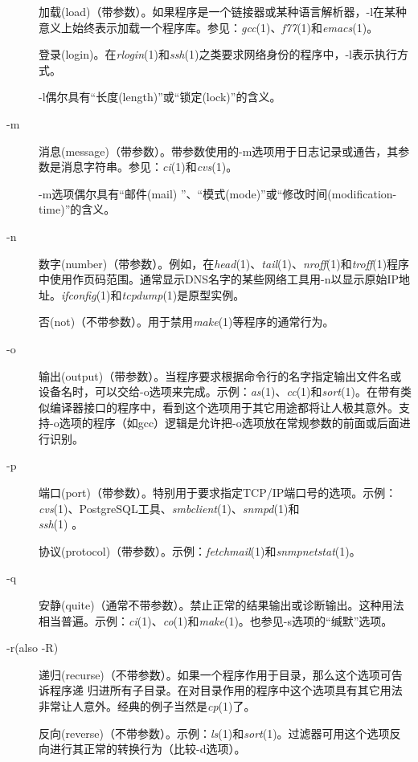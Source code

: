 \documentclass[12pt,oneside]{book}
\begin{document}
\begin{description}
加载(load)（带参数）。如果程序是一个链接器或某种语言解析器，-l在某种意义上始终表示加载一个程序库。参见：\textit{gcc}(1)、\textit{f77}(1)和\textit{emacs}(1)。

 登录(login)。在\textit{rlogin}(1)和\textit{ssh}(1)之类要求网络身份的程序中，-l表示执行方式。

-l偶尔具有“长度(length)”或“锁定(lock)”的含义。

\item[-m] 消息(message)（带参数）。带参数使用的-m选项用于日志记录或通告，其参数是消息字符串。参见：\textit{ci}(1)和\textit{cvs}(1)。

-m选项偶尔具有“邮件(mail) ”、“模式(mode)”或“修改时间(modification-time)”的含义。

\item[-n] 数字(number)（带参数）。例如，在\textit{head}(1)、\textit{tail}(1)、\textit{nroff}(1)和\textit{troff}(1)程序中使用作页码范围。通常显示DNS名字的某些网络工具用-n以显示原始IP地址。\textit{ifconfig}(1)和\textit{tcpdump}(1)是原型实例。

否(not)（不带参数）。用于禁用\textit{make}(1)等程序的通常行为。

\item[-o] 输出(output)（带参数）。当程序要求根据命令行的名字指定输出文件名或设备名时，可以交给-o选项来完成。示例：\textit{as}(1)、\textit{cc}(1)和\textit{sort}(1)。在带有类似编译器接口的程序中，看到这个选项用于其它用途都将让人极其意外。支持-o选项的程序（如gcc）逻辑是允许把-o选项放在常规参数的前面或后面进行识别。

\item[-p] 端口(port)（带参数）。特别用于要求指定TCP/IP端口号的选项。示例：\textit{cvs}(1)、PostgreSQL工具、\textit{smbclient}(1)、\textit{snmpd}(1)和\\ \textit{ssh}(1) 。

协议(protocol)（带参数）。示例：\textit{fetchmail}(1)和\textit{snmpnetstat}(1)\linebreak 。

\item[-q] 安静(quite)（通常不带参数）。禁止正常的结果输出或诊断输出。这种用法相当普遍。示例：\textit{ci}(1)、\textit{co}(1)和\textit{make}(1)。也参见-s选项的“缄默”选项。

\item[-r(also -R)] 递归(recurse)（不带参数）。如果一个程序作用于目录，那么这个选项可告诉程序递
归进所有子目录。在对目录作用的程序中这个选项具有其它用法非常让人意外。经典的例子当然是\textit{cp}(1)了。

反向(reverse)（不带参数）。示例：\textit{ls}(1)和\textit{sort}(1)。过滤器可用这个选项反向进行其正常的转换行为（比较-d选项）。


\end{description}
\end{document}
